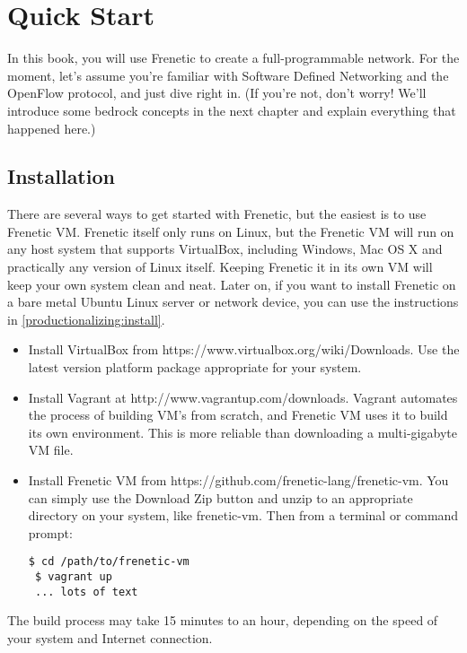 \chapter{Quick Start}

In this book, you will use Frenetic to create a full-programmable network.  For the moment, let's assume you're familiar with Software Defined Networking and the OpenFlow protocol, and just dive right in.  (If you're not, don't worry!  We'll introduce some bedrock concepts in the next chapter and explain everything that happened here.)  

\section{Installation}

There are several ways to get started with Frenetic, but the easiest is to use Frenetic VM.  Frenetic itself only runs on Linux, but the Frenetic VM will run on any host system that supports VirtualBox, including Windows, Mac OS X and practically any version of Linux itself.   Keeping Frenetic it in its own VM will keep your own system clean and neat.  Later on, if you want to install Frenetic on a bare metal Ubuntu Linux server or network device, you can use the instructions in \ref{productionalizing:install}.  

\begin{itemize}
\item Install VirtualBox from https://www.virtualbox.org/wiki/Downloads.  Use the latest version platform package appropriate for your system.  
\item Install Vagrant at http://www.vagrantup.com/downloads.  Vagrant automates the process of building VM's from scratch, and Frenetic VM uses it to build its own environment.  This is more reliable than downloading a multi-gigabyte VM file.   
\item Install Frenetic VM from https://github.com/frenetic-lang/frenetic-vm.  You can simply use the Download Zip button and unzip to an appropriate directory on your system, like frenetic-vm.  Then from a terminal or command prompt:

\begin{lstlisting}[style=BashInputStyle]
 $ cd /path/to/frenetic-vm
 $ vagrant up
 ... lots of text 
\end{lstlisting}
\end{itemize}

The build process may take 15 minutes to an hour, depending on the speed of your system and Internet connection. 

